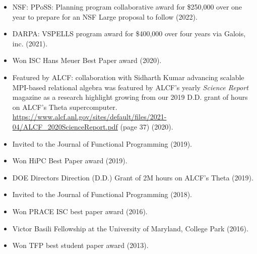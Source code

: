 \begin{itemize}
\item NSF: PPoSS: Planning program collaborative award for \$250,000 over one year to prepare for an NSF Large proposal to follow (2022).
\item DARPA: VSPELLS program award for \$400,000 over four years via Galois, inc. (2021).
\item Won ISC Hans Meuer Best Paper award (2020).
\item Featured by ALCF: collaboration with Sidharth Kumar advancing scalable MPI-based relational algebra was featured by ALCF's yearly \emph{Science Report} magazine as a research highlight growing from our 2019 D.D. grant of hours on ALCF's Theta supercomputer. \url{https://www.alcf.anl.gov/sites/default/files/2021-04/ALCF_2020ScienceReport.pdf} (page 37) (2020).
\item Invited to the Journal of Functional Programming (2019).
\item Won HiPC Best Paper award (2019).
\item DOE Directors Direction (D.D.) Grant of 2M hours on ALCF's Theta (2019).
\item Invited to the Journal of Functional Programming (2018).
\item Won PRACE ISC best paper award (2016).
\item Victor Basili Fellowship at the University of Maryland, College Park (2016).
\item Won TFP best student paper award (2013).
\end{itemize}
